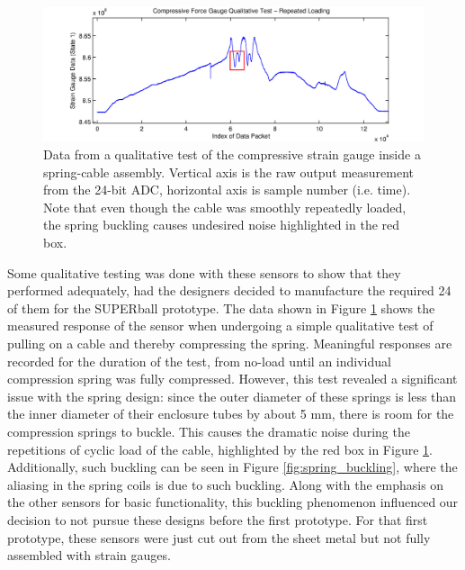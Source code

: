 \documentclass[12pt]{report}
\begin{document}
\begin{figure}[thpb]
      \centering
      \includegraphics[width=0.9\columnwidth]{img/rodtest_slow.jpg}
      \caption{Data from a qualitative test of the compressive strain gauge inside a spring-cable assembly. Vertical axis is the raw output measurement from the 24-bit ADC, horizontal axis is sample number (i.e. time). Note that even though the cable was smoothly repeatedly loaded, the spring buckling causes undesired noise highlighted in the red box.}
      \label{fig:compression_sensor_data}
      \vspace{-0.2cm}
\end{figure}

Some qualitative testing was done with these sensors to show that they performed adequately, had the designers decided to manufacture the required 24 of them for the SUPERball prototype.
The data shown in Figure \ref{fig:compression_sensor_data} shows the measured response of the sensor when undergoing a simple qualitative test of pulling on a cable and thereby compressing the spring.
Meaningful responses are recorded for the duration of the test, from no-load until an individual compression spring was fully compressed.
However, this test revealed a significant issue with the spring design: since the outer diameter of these springs is less than the inner diameter of their enclosure tubes by about 5 mm, there is room for the compression springs to buckle.
This causes the dramatic noise during the repetitions of cyclic load of the cable, highlighted by the red box in Figure \ref{fig:compression_sensor_data}.
Additionally, such buckling can be seen in Figure \ref{fig:spring_buckling}, where the aliasing in the spring coils is due to such buckling.
Along with the emphasis on the other sensors for basic functionality, this buckling phenomenon influenced our decision to not pursue these designs before the first prototype.
For that first prototype, these sensors were just cut out from the sheet metal but not fully assembled with strain gauges.
\end{document}
